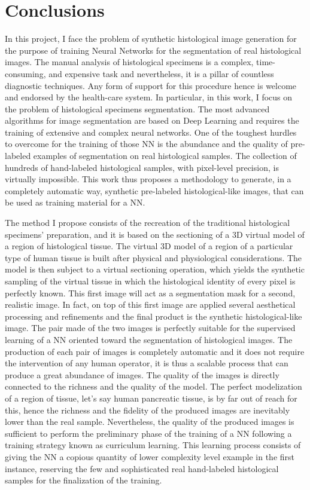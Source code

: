 \chapter*{Conclusions}
\label{chap:concl}

In this project, I face the problem of synthetic histological image generation for the purpose of training Neural Networks for the segmentation of real histological images. The manual analysis of histological specimens is a complex, time-consuming, and expensive task and nevertheless, it is a pillar of countless diagnostic techniques. Any form of support for this procedure hence is welcome and endorsed by the health-care system. In particular, in this work, I focus on the problem of histological specimens segmentation. The most advanced algorithms for image segmentation are based on Deep Learning and requires the training of extensive and complex neural networks. One of the toughest hurdles to overcome for the training of those NN is the abundance and the quality of pre-labeled examples of segmentation on real histological samples. The collection of hundreds of hand-labeled histological samples, with pixel-level precision, is virtually impossible. This work thus proposes a methodology to generate, in a completely automatic way, synthetic pre-labeled histological-like images, that can be used as training material for a NN.

The method I propose consists of the recreation of the traditional histological specimens' preparation, and it is based on the sectioning of a 3D virtual model of a region of histological tissue. The virtual 3D model of a region of a particular type of human tissue is built after physical and physiological considerations. The model is then subject to a virtual sectioning operation, which yields the synthetic sampling of the virtual tissue in which the histological identity of every pixel is perfectly known. This first image will act as a segmentation mask for a second, realistic image. In fact, on top of this first image are applied several aesthetical processing and refinements and the final product is the synthetic histological-like image. The pair made of the two images is perfectly suitable for the supervised learning of a NN oriented toward the segmentation of histological images. The production of each pair of images is completely automatic and it does not require the intervention of any human operator, it is thus a scalable process that can produce a great abundance of images. The quality of the images is directly connected to the richness and the quality of the model. The perfect modelization of a region of tissue, let's say human pancreatic tissue, is by far out of reach for this, hence the richness and the fidelity of the produced images are inevitably lower than the real sample. Nevertheless, the quality of the produced images is sufficient to perform the preliminary phase of the training of a NN following a training strategy known as curriculum learning. This learning process consists of giving the NN a copious quantity of lower complexity level example in the first instance, reserving the few and sophisticated real hand-labeled histological samples for the finalization of the training.

